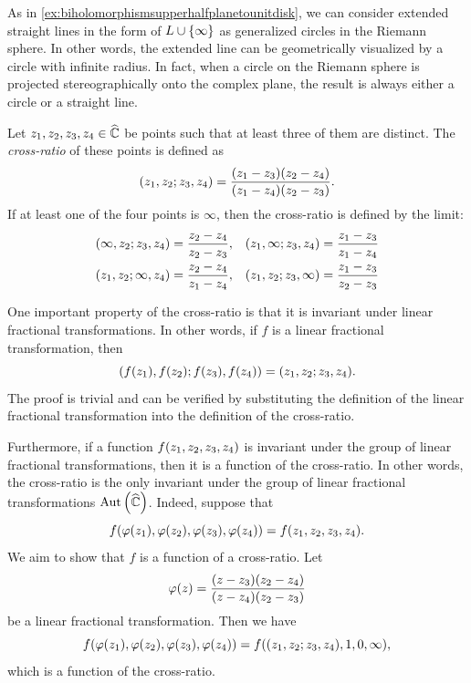 \begin{remark}
    As in \cref{ex:biholomorphismsupperhalfplanetounitdisk}, we can consider extended straight lines in the form of \(L\cup\cbraces{\infty}\) as generalized circles in the Riemann sphere. In other words, the extended line can be geometrically visualized by a circle with infinite radius. In fact, when a circle on the Riemann sphere is projected stereographically onto the complex plane, the result is always either a circle or a straight line.
\end{remark}
\begin{definition}\label{def:crossratio}
    Let \(z_1,z_2,z_3,z_4\in\widehat{\mathbb{C}}\) be points such that at least three of them are distinct. The \textit{cross-ratio} of these points is defined as \[\qty(z_1,z_2;z_3,z_4)=\frac{\qty(z_1-z_3)\qty(z_2-z_4)}{\qty(z_1-z_4)\qty(z_2-z_3)}.\] If at least one of the four points is \(\infty\), then the cross-ratio is defined by the limit:
    \begin{align*}
        \qty(\infty,z_2;z_3,z_4) & =\frac{z_2-z_4}{z_2-z_3}, & \qty(z_1,\infty;z_3,z_4) & =\frac{z_1-z_3}{z_1-z_4} \\
        \qty(z_1,z_2;\infty,z_4) & =\frac{z_2-z_4}{z_1-z_4}, & \qty(z_1,z_2;z_3,\infty) & =\frac{z_1-z_3}{z_2-z_3}
    \end{align*}
\end{definition}
One important property of the cross-ratio is that it is invariant under linear fractional transformations. In other words, if \(f\) is a linear fractional transformation, then \[\qty(f\qty(z_1),f\qty(z_2);f\qty(z_3),f\qty(z_4))=\qty(z_1,z_2;z_3,z_4).\] The proof is trivial and can be verified by substituting the definition of the linear fractional transformation into the definition of the cross-ratio.

Furthermore, if a function \(f\qty(z_1,z_2,z_3,z_4)\) is invariant under the group of linear fractional transformations, then it is a function of the cross-ratio. In other words, the cross-ratio is the only invariant under the group of linear fractional transformations \(\operatorname{Aut}\qty(\widehat{\mathbb{C}})\). Indeed, suppose that \[f\qty(\varphi\qty(z_1),\varphi\qty(z_2),\varphi\qty(z_3),\varphi\qty(z_4))=f\qty(z_1,z_2,z_3,z_4).\] We aim to show that \(f\) is a function of a cross-ratio. Let \[\varphi(z)=\frac{\qty(z-z_3)\qty(z_2-z_4)}{\qty(z-z_4)\qty(z_2-z_3)}\] be a linear fractional transformation. Then we have \[f\qty(\varphi\qty(z_1),\varphi\qty(z_2),\varphi\qty(z_3),\varphi\qty(z_4))=f\qty(\qty(z_1,z_2;z_3,z_4),1,0,\infty),\] which is a function of the cross-ratio.